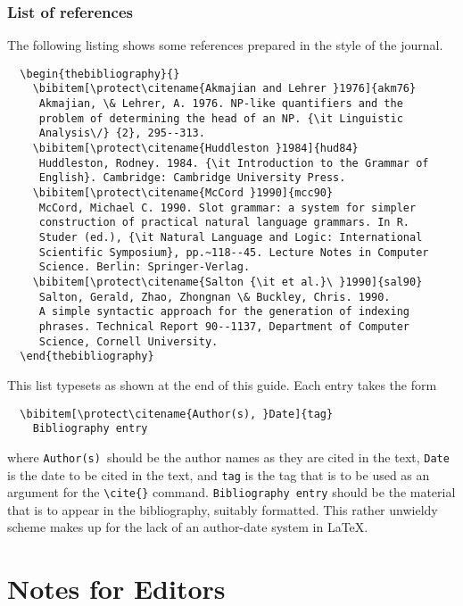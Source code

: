 \documentclass{jfp}
\begin{document}
\subsubsection{List of references}\label{fullref}

The following listing shows some references prepared in the style of the
journal.
%
{\fontsize{7}{9}\selectfont
\begin{verbatim}
  \begin{thebibliography}{}
    \bibitem[\protect\citename{Akmajian and Lehrer }1976]{akm76}
     Akmajian, \& Lehrer, A. 1976. NP-like quantifiers and the
     problem of determining the head of an NP. {\it Linguistic
     Analysis\/} {2}, 295--313.
    \bibitem[\protect\citename{Huddleston }1984]{hud84}
     Huddleston, Rodney. 1984. {\it Introduction to the Grammar of
     English}. Cambridge: Cambridge University Press.
    \bibitem[\protect\citename{McCord }1990]{mcc90}
     McCord, Michael C. 1990. Slot grammar: a system for simpler
     construction of practical natural language grammars. In R.
     Studer (ed.), {\it Natural Language and Logic: International
     Scientific Symposium}, pp.~118--45. Lecture Notes in Computer
     Science. Berlin: Springer-Verlag.
    \bibitem[\protect\citename{Salton {\it et al.}\ }1990]{sal90}
     Salton, Gerald, Zhao, Zhongnan \& Buckley, Chris. 1990.
     A simple syntactic approach for the generation of indexing
     phrases. Technical Report 90--1137, Department of Computer
     Science, Cornell University.
  \end{thebibliography}
\end{verbatim}}
%
This list typesets as shown at the end of this guide.
Each entry takes the form
%
\begin{verbatim}
  \bibitem[\protect\citename{Author(s), }Date]{tag}
    Bibliography entry
\end{verbatim}
%
where \verb"Author(s)"\ should be the author names as they are cited in
the text, \verb"Date" is the date to be cited in the text, and \verb"tag"
is the tag that is to be used as an argument for the \verb"\cite{}" command.
\verb"Bibliography entry" should be the
material that is to appear in the bibliography, suitably formatted.  This
rather unwieldy scheme makes up for the lack of an author-date system in
LaTeX.

\section{Notes for Editors}
\end{document}
